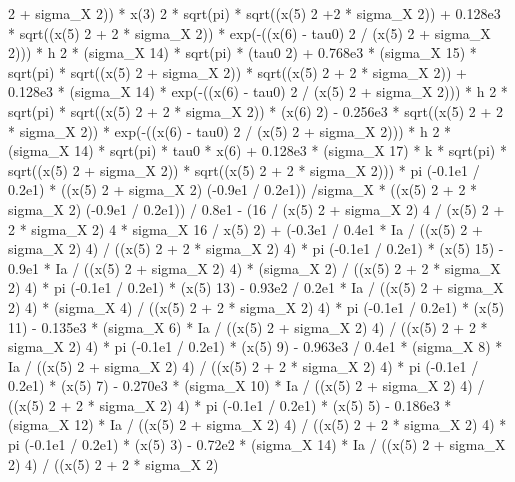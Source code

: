 \begin{maplegroup}
 2 + sigma\_X  2)) * x(3)  2 * sqrt(pi) * sqrt((x(5)  2 +2 * sigma\_X  2)) + 0.128e3 * sqrt((x(5)  2 + 2 * sigma\_X  2)) * exp(-((x(6) - tau0)  2 / (x(5)  2 + sigma\_X  2))) * h  2 * (sigma\_X  14) * sqrt(pi) * (tau0  2) + 0.768e3 * (sigma\_X  15) * sqrt(pi) * sqrt((x(5)  2 + sigma\_X  2)) * sqrt((x(5) 2 + 2 * sigma\_X  2)) + 0.128e3 * (sigma\_X  14) * exp(-((x(6) - tau0)  2 / (x(5)  2 + sigma\_X  2))) * h  2 * sqrt(pi) * sqrt((x(5)  2 + 2 * sigma\_X  2)) * (x(6)  2) - 0.256e3 * sqrt((x(5)  2 + 2 * sigma\_X  2)) * exp(-((x(6) - tau0)  2 / (x(5) 2 + sigma\_X  2))) * h  2 * (sigma\_X  14) * sqrt(pi) * tau0 * x(6) + 0.128e3 * (sigma\_X  17) * k * sqrt(pi) * sqrt((x(5)  2 + sigma\_X  2)) * sqrt((x(5)  2 + 2 * sigma\_X  2))) * pi  (-0.1e1 / 0.2e1) * ((x(5)  2 + sigma\_X  2)  (-0.9e1 / 0.2e1)) /sigma\_X * ((x(5)  2 + 2 * sigma\_X  2)  (-0.9e1 / 0.2e1)) / 0.8e1 - (16 / (x(5)  2 + sigma\_X  2)  4 / (x(5)  2 + 2 * sigma\_X  2)  4 * sigma\_X  16 / x(5)  2) + (-0.3e1 / 0.4e1 * Ia / ((x(5)  2 + sigma\_X  2)  4) / ((x(5)  2 + 2 * sigma\_X  2) 4) * pi  (-0.1e1 / 0.2e1) * (x(5)  15) - 0.9e1 * Ia / ((x(5)  2 + sigma\_X  2)  4) * (sigma\_X  2) / ((x(5)  2 + 2 * sigma\_X  2)  4) * pi  (-0.1e1 / 0.2e1) * (x(5)  13) - 0.93e2 / 0.2e1 * Ia / ((x(5)  2 + sigma\_X  2)  4) * (sigma\_X  4) / ((x(5)  2 + 2 * sigma\_X  2)  4) * pi  (-0.1e1 / 0.2e1) * (x(5)  11) - 0.135e3 * (sigma\_X  6) * Ia / ((x(5)  2 + sigma\_X  2)  4) / ((x(5)  2 + 2 * sigma\_X  2)  4) * pi  (-0.1e1 / 0.2e1) * (x(5)  9) - 0.963e3 / 0.4e1 * (sigma\_X  8) * Ia / ((x(5) 2 + sigma\_X  2)  4) / ((x(5)  2 + 2 * sigma\_X  2)  4) * pi  (-0.1e1 / 0.2e1) * (x(5)  7) - 0.270e3 * (sigma\_X  10) * Ia / ((x(5)  2 + sigma\_X  2)  4) / ((x(5)  2 + 2 * sigma\_X  2)  4) * pi  (-0.1e1 / 0.2e1) * (x(5)  5) - 0.186e3 * (sigma\_X 12) * Ia / ((x(5)  2 + sigma\_X  2)  4) / ((x(5)  2 + 2 * sigma\_X  2)  4) * pi  (-0.1e1 / 0.2e1) * (x(5)  3) - 0.72e2 * (sigma\_X  14) * Ia / ((x(5)  2 + sigma\_X  2)  4) / ((x(5)  2 + 2 * sigma\_X  2) 
\end{maplegroup}
